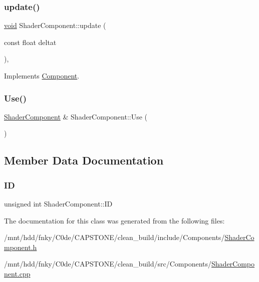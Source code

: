 \subsubsection{\texorpdfstring{update()}{update()}}
{\footnotesize\ttfamily \hyperlink{imgui__impl__opengl3__loader_8h_ac668e7cffd9e2e9cfee428b9b2f34fa7}{void} Shader\+Component\+::update (\begin{DoxyParamCaption}\item[{const float}]{deltat }\end{DoxyParamCaption})\hspace{0.3cm}{\ttfamily [inline]}, {\ttfamily [virtual]}}



Implements \hyperlink{classComponent_a3448977e6f464df89e77dda7c6f52204}{Component}.

\mbox{\label{classShaderComponent_aecf930a4a91e58138270d4edb92c3f98}} 
\subsubsection{\texorpdfstring{Use()}{Use()}}
{\footnotesize\ttfamily \hyperlink{classShaderComponent}{Shader\+Component} \& Shader\+Component\+::\+Use (\begin{DoxyParamCaption}{ }\end{DoxyParamCaption})}



\subsection{Member Data Documentation}
\mbox{\label{classShaderComponent_a86e364d55d966ff81256f54bfe061fae}} 
\subsubsection{\texorpdfstring{ID}{ID}}
{\footnotesize\ttfamily unsigned int Shader\+Component\+::\+ID\hspace{0.3cm}{\ttfamily [private]}}



The documentation for this class was generated from the following files\+:\begin{DoxyCompactItemize}
\item 
/mnt/hdd/fnky/\+C0de/\+C\+A\+P\+S\+T\+O\+N\+E/clean\+\_\+build/include/\+Components/\hyperlink{ShaderComponent_8h}{Shader\+Component.\+h}\item 
/mnt/hdd/fnky/\+C0de/\+C\+A\+P\+S\+T\+O\+N\+E/clean\+\_\+build/src/\+Components/\hyperlink{ShaderComponent_8cpp}{Shader\+Component.\+cpp}\end{DoxyCompactItemize}
